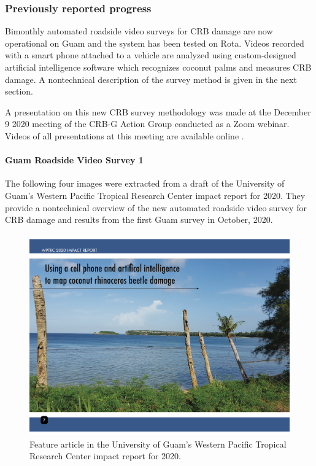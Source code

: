 \documentclass[12pt,letterpaper,english,bibliography=totocnumbered, abstract=on]{scrartcl}
\begin{document}
\subsubsection{Previously reported progress}

Bimonthly automated roadside video surveys for CRB damage are now operational on Guam and the system has been tested on Rota. Videos recorded with a smart phone attached to a vehicle are analyzed using custom-designed artificial intelligence software which recognizes coconut palms and measures CRB damage. A nontechnical description of the survey method is given in the next section.

A presentation on this new CRB survey methodology was made at the December 9 2020 meeting of the CRB-G Action Group conducted as a Zoom webinar. Videos of all presentations at this meeting are available online \cite{mooreVideoRecordingCRBG2020}.

\clearpage
\paragraph{Guam Roadside Video Survey 1}

The following four images were extracted from a draft of the University of Guam's Western Pacific Tropical Research Center impact report for 2020. They provide a nontechnical overview of the new automated roadside video survey for CRB damage and results from the first Guam survey in October, 2020.

\begin{figure}[h]
	\centering
	\includegraphics[width=1\linewidth]{../images/impact-report07.png}
	\caption{Feature article in the University of Guam's Western Pacific Tropical Research Center impact report for 2020.}
	\label{fig:roadside1-1}
\end{figure}
\end{document}
